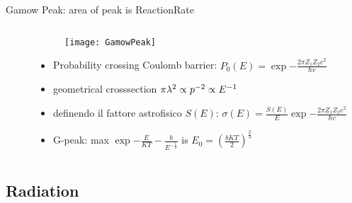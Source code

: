 \begin{frame}{Gamow Peak: area of peak is ReactionRate}
\begin{columns}[T]
\begin{column}{0.75\textwidth}
        \end{column}
        \begin{column}{0.25\textwidth}
    \begin{figure}[!ht]\texttt{[image: GamowPeak]}\label{fig:GamowPeak}
	\end{figure}
    \begin{itemize}
                    \item Probability crossing Coulomb barrier: $P_0(E)=\exp{-\frac{2\pi Z_1Z_2e^2}{\hbar v}}$
                    \item geometrical crosssection $\pi\lambda^2\propto p^{-2}\propto{E}^{-1}$
                    \item definendo il fattore astrofisico $S(E)$: $\sigma(E)=\frac{S(E)}{E}\exp{-\frac{2\pi Z_1Z_2e^2}{\hbar v}}$
                    \item G-peak: max $\exp{-\frac{E}{KT}-\frac{b}{E^{-\frac{1}{2}}}}$ is $E_0=(\frac{bKT}{2})^{\frac{2}{3}}$
        \end{itemize}
        \end{column}
    \end{columns}
    \begin{itemize}
        \end{itemize}
\end{frame}

\subsection{Radiation}

